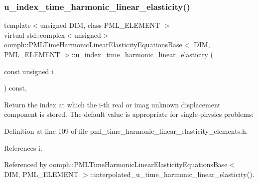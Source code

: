 \subsubsection{\texorpdfstring{u\+\_\+index\+\_\+time\+\_\+harmonic\+\_\+linear\+\_\+elasticity()}{u\_index\_time\_harmonic\_linear\_elasticity()}}
{\footnotesize\ttfamily template$<$unsigned D\+IM, class P\+M\+L\+\_\+\+E\+L\+E\+M\+E\+NT $>$ \\
virtual std\+::complex$<$unsigned$>$ \hyperlink{classoomph_1_1PMLTimeHarmonicLinearElasticityEquationsBase}{oomph\+::\+P\+M\+L\+Time\+Harmonic\+Linear\+Elasticity\+Equations\+Base}$<$ D\+IM, P\+M\+L\+\_\+\+E\+L\+E\+M\+E\+NT $>$\+::u\+\_\+index\+\_\+time\+\_\+harmonic\+\_\+linear\+\_\+elasticity (\begin{DoxyParamCaption}\item[{const unsigned}]{i }\end{DoxyParamCaption}) const\hspace{0.3cm}{\ttfamily [inline]}, {\ttfamily [virtual]}}



Return the index at which the i-\/th real or imag unknown displacement component is stored. The default value is appropriate for single-\/physics problems\+: 



Definition at line 109 of file pml\+\_\+time\+\_\+harmonic\+\_\+linear\+\_\+elasticity\+\_\+elements.\+h.



References i.



Referenced by oomph\+::\+P\+M\+L\+Time\+Harmonic\+Linear\+Elasticity\+Equations\+Base$<$ D\+I\+M, P\+M\+L\+\_\+\+E\+L\+E\+M\+E\+N\+T $>$\+::interpolated\+\_\+u\+\_\+time\+\_\+harmonic\+\_\+linear\+\_\+elasticity().

\mbox{\label{classoomph_1_1PMLTimeHarmonicLinearElasticityEquationsBase_a0c3e98b10a79cfbe3849cfdafff1dde2}} 
